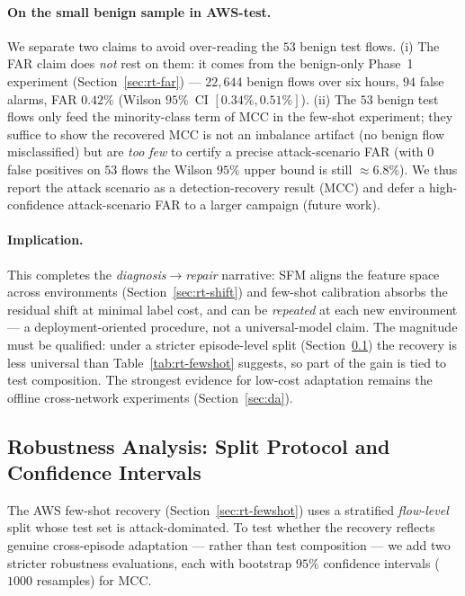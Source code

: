 \documentclass[preprint,12pt,authoryear]{elsarticle}
\begin{document}
\paragraph{On the small benign sample in AWS-test.} We separate two claims to avoid
over-reading the $53$ benign test flows. (i) The FAR claim does \emph{not} rest on
them: it comes from the benign-only Phase~1 experiment
(Section~\ref{sec:rt-far}) --- $22{,}644$ benign flows over six hours, $94$ false
alarms, FAR $0.42\%$ (Wilson $95\%$~CI $[0.34\%,0.51\%]$). (ii) The $53$ benign
test flows only feed the minority-class term of MCC in the few-shot experiment;
they suffice to show the recovered MCC is not an imbalance artifact (no benign flow
misclassified) but are \emph{too few} to certify a precise attack-scenario FAR
(with $0$ false positives on $53$ flows the Wilson $95\%$ upper bound is still
$\approx 6.8\%$). We thus report the attack scenario as a detection-recovery result
(MCC) and defer a high-confidence attack-scenario FAR to a larger campaign (future
work).

\paragraph{Implication.} This completes the \emph{diagnosis}$\to$\emph{repair}
narrative: SFM aligns the feature space across environments
(Section~\ref{sec:rt-shift}) and few-shot calibration absorbs the residual shift at
minimal label cost, and can be \emph{repeated} at each new environment --- a
deployment-oriented procedure, not a universal-model claim. The magnitude must be
qualified: under a stricter episode-level split (Section~\ref{sec:rt-robust}) the
recovery is less universal than Table~\ref{tab:rt-fewshot} suggests, so part of the
gain is tied to test composition. The strongest evidence for low-cost adaptation
remains the offline cross-network experiments (Section~\ref{sec:da}).

\subsection{Robustness Analysis: Split Protocol and Confidence Intervals}
\label{sec:rt-robust}

The AWS few-shot recovery (Section~\ref{sec:rt-fewshot}) uses a stratified
\emph{flow-level} split whose test set is attack-dominated. To test whether the
recovery reflects genuine cross-episode adaptation --- rather than test composition
--- we add two stricter robustness evaluations, each with bootstrap $95\%$
confidence intervals ($1000$ resamples) for MCC.
\end{document}
